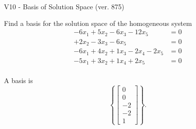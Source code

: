 \begin{exercise}
  \begin{exerciseTitle}V10 - Basis of Solution Space (ver. 875)\end{exerciseTitle}
  \begin{exerciseStatement}
    Find a basis for the solution space of the homogeneous system 
\begin{align*}
 -6 x_ 1 + 5 x_ 2 -6 x_ 3 -12 x_ 5 &= 0  \\ 
  + 2 x_ 2 -3 x_ 3 -6 x_ 5 &= 0  \\ 
  -6 x_ 1 + 4 x_ 2 + 1 x_ 3 -2 x_ 4 -2 x_ 5 &= 0  \\ 
  -5 x_ 1 + 3 x_ 2 + 1 x_ 4 + 2 x_ 5 &= 0  \\ 
 \end{align*}


 
  \end{exerciseStatement}

  \begin{exerciseAnswer}
   A basis is   
\[\left\{\left[\begin{array}{c}
0 \\
0 \\
-2 \\
-2 \\
1
\end{array}\right]\right\}.\]

  


  \end{exerciseAnswer}
\end{exercise}